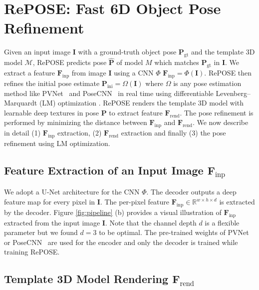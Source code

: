 \documentclass[10pt,twocolumn,letterpaper]{article}
\begin{document}
\section{RePOSE: Fast 6D Object Pose Refinement}
\label{sec:method}
Given an input image $\mathbf{I}$ with a ground-truth object pose $\mathbf{P}_\text{gt}$ and the template 3D model $\mathcal{M}$, RePOSE predicts pose $\mathbf{\hat{P}}$ of model $M$ which matches $\mathbf{P}_\text{gt}$ in $\mathbf{I}$. We extract a feature $\mathbf{F}_\text{inp}$ from image $\mathbf{I}$ using a CNN $\Phi$ \ie $\mathbf{F}_\text{inp} = \Phi(\mathbf{I})$. RePOSE then refines the initial pose estimate $\mathbf{P}_\text{ini} = \Omega(\mathbf{I})$ where $\Omega$ is any pose estimation method like PVNet~\cite{peng2019pvnet} and PoseCNN~\cite{xiang2018posecnn} in real time using differentiable Levenberg–Marquardt (LM) optimization \cite{10.1007/BFb0067700}. RePOSE renders the template 3D model with learnable deep textures in pose $\mathbf{P}$ to extract feature $\mathbf{F}_\text{rend}$. The pose refinement is performed by minimizing the distance between $\mathbf{F}_\text{inp}$ and $\mathbf{F}_\text{rend}$. We now describe in detail (1) $\mathbf{F}_\text{inp}$ extraction, (2) $\mathbf{F}_\text{rend}$ extraction and finally (3) the pose refinement using LM optimization.

\subsection{Feature Extraction of an Input Image $\mathbf{F}_\text{inp}$} 
\label{sec:deep_feet_ext}

We adopt a U-Net \cite{RFB15a} architecture for the CNN $\Phi$. The decoder outputs a deep feature map for every pixel in $\mathbf{I}$. The per-pixel feature $\mathbf{F}_\text{inp} \in \mathbb{R}^{w \times h \times d}$ is extracted by the decoder. Figure \ref{fig:pipeline} (b) provides a visual illustration of $\mathbf{F}_\text{inp}$ extracted from the input image $\mathbf{I}$. Note that the channel depth $d$ is a flexible parameter but we found $d=3$ to be optimal. The pre-trained weights of PVNet~\cite{peng2019pvnet} or PoseCNN~\cite{xiang2018posecnn} are used for the encoder and only the decoder is trained while training RePOSE. 

\subsection{Template 3D Model Rendering $\mathbf{F}_\text{rend}$}
\label{sec:deep_feet_rend}
\end{document}
